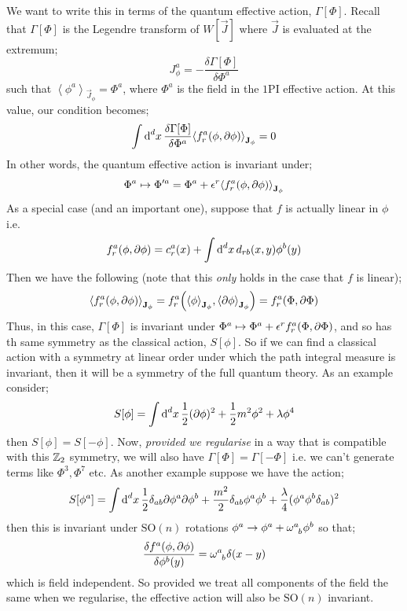 We want to write this in terms of the quantum effective action, $\Gamma[\Phi]$. Recall that $\Gamma[\Phi]$ is the Legendre transform of $W[\vec{J}]$ where $\vec{J}$ is evaluated at the extremum;
\begin{equation*}
J_\phi^a = -\frac{\delta \Gamma[\Phi]}{\delta \Phi^a}
\end{equation*}
such that $\left< \phi^a \right>_{\vec{J}_\phi} = \Phi^a$, where $\Phi^a$ is the field in the $1$PI effective action. At this value, our condition becomes;
\begin{equation*}
\int{\upd{^d x}\frac{\delta \Gamma[\Phi]}{\delta \Phi^a} \left< f_r^a(\phi, \del \phi) \right>_{\vec{J}_\phi}} = 0
\end{equation*}
In other words, the quantum effective action is invariant under;
\begin{equation*}
\Phi^a \mapsto \Phi^{\prime a} = \Phi^a + \epsilon^r \left< f^a_r(\phi, \del \phi) \right>_{\vec{J}_\phi}
\end{equation*}
As a special case (and an important one), suppose that $f$ is actually linear in $\phi$ i.e.
\begin{equation*}
f^a_r(\phi, \partial\phi) = c_r^a(x) + \int{\text{d}^d x \,d_{rb}(x, y)\phi^b(y)}
\end{equation*}
Then we have the following (note that this \emph{only} holds in the case that $f$ is linear);
\begin{equation}
\left< f^a_r(\phi, \del \phi) \right>_{\vec{J}_\phi} = f_r^a\left(\left< \phi \right>_{\vec{J}_\phi}, \left< \del \phi \right>_{\vec{J}_\phi}\right) = f_r^a(\Phi, \del \Phi)
\end{equation}
Thus, in this case, $\Gamma[\Phi]$ is invariant under $\Phi^a \mapsto \Phi^a + \epsilon^r f_r^a(\Phi, \partial \Phi)$, and so has th same symmetry as the classical action, $S[\phi]$. So if we can find a classical action with a symmetry at linear order under which the path integral measure is invariant, then it will be a symmetry of the full quantum theory. As an example consider;
\begin{equation*}
S[\phi] = \int{\text{d}^d x \,\frac{1}{2}(\partial\phi)^2 + \frac{1}{2}m^2 \phi^2 + \lambda \phi^4}
\end{equation*}
then $S[\phi] = S[-\phi]$. Now, \emph{provided we regularise} in a way that is compatible with this $\mathbb{Z}_2$ symmetry, we will also have $\Gamma[\Phi] = \Gamma[-\Phi]$ i.e. we can't generate terms like $\Phi^3, \Phi^7$ etc. As another example suppose we have the action;
\begin{equation*}
S[\phi^a] = \int{\text{d}^d x \,\frac{1}{2}\delta_{ab}\partial\phi^a \partial\phi^b + \frac{m^2}{2}\delta_{ab}\phi^a \phi^b + \frac{\lambda}{4}(\phi^a \phi^b \delta_{ab})^2}
\end{equation*}
then this is invariant under $\text{SO}(n)$ rotations $\phi^a \rightarrow \phi^a + \omega\indices{^{a}_{b}}\phi^b$ so that;
\begin{equation*}
\frac{\delta f^a(\phi, \del \phi)}{\delta \phi^b(y)} = \omega\indices{^{a}_{b}}\delta(x - y)
\end{equation*}
which is field independent. So provided we treat all components of the field the same when we regularise, the effective action will also be $\text{SO}(n)$ invariant.

